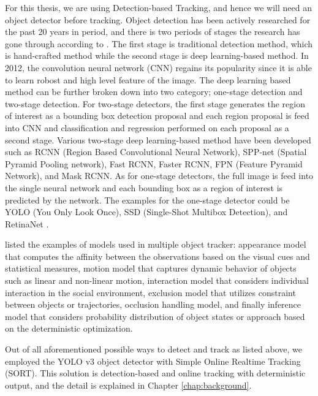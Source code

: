 For this thesis, we are using Detection-based Tracking, and hence we will need an object detector before tracking. Object detection has been actively researched for the past 20 years in period, and there is two periods of stages the research has gone through according to \citeauthor{zou_object_2019} \cite{zou_object_2019}. The first stage is traditional detection method, which is hand-crafted method while the second stage is deep learning-based method. In 2012, the convolution neural network (CNN) regains its popularity since it is able to learn robost and high level feature of the image. The deep learning based method can be further broken down into two category; one-stage detection and two-stage detection. For two-stage detectors, the first stage generates the region of interest as a bounding box detection proposal and each region proposal is feed into CNN and classification and regression performed on each proposal as a second stage. Various two-stage deep learning-based method have been developed such as RCNN (Region Based Convolutional Neural Network), SPP-net (Spatial Pyramid Pooling network), Fast RCNN, Faster RCNN, FPN (Feature Pyramid Network), and Mask RCNN. As for one-stage detectors, the full image is feed into the single neural network and each bounding box as a region of interest is predicted by the network. The examples for the one-stage detector could be YOLO (You Only Look Once), SSD (Single-Shot Multibox Detection), and RetinaNet \cite{zou_object_2019} \cite{sultana_review_2020}.

\citeauthor{luo_multiple_2021} listed the examples of models used in multiple object tracker: appearance model that computes the affinity between the observations based on the visual cues and statistical measures, motion model that captures dynamic behavior of objects such as linear and non-linear motion, interaction model that considers individual interaction in the social environment, exclusion model that utilizes constraint between objects or trajectories, occlusion handling model, and finally inference model that considers probability distribution of object states or approach based on the deterministic optimization.

Out of all aforementioned possible ways to detect and track as listed above, we employed the YOLO v3 object detector with Simple Online Realtime Tracking (SORT). This solution is detection-based and online tracking with deterministic output, and the detail is explained in Chapter \ref{chap:background}.
